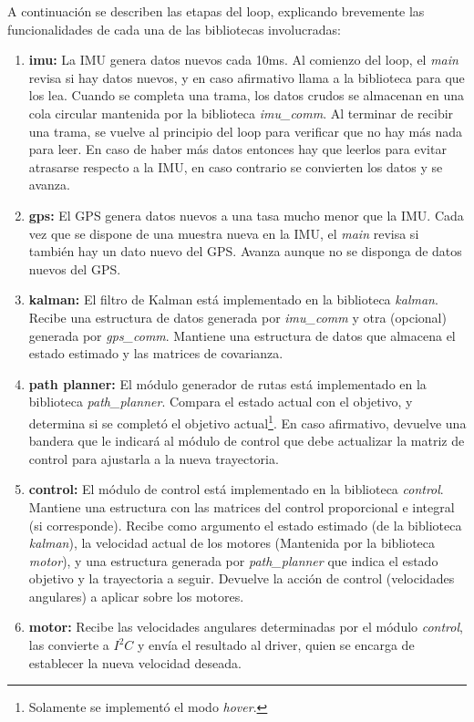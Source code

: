 \documentclass[main]{subfiles}
\begin{document}
A continuaci\'on se describen las etapas del loop, explicando brevemente las funcionalidades de cada una de las bibliotecas involucradas:
\begin{enumerate}

\item \textbf{imu:} La IMU genera datos nuevos cada 10ms. Al comienzo del loop, el \textit{main} revisa si hay datos nuevos, y en caso afirmativo llama a la biblioteca para que los lea. Cuando se completa una trama, los datos crudos se almacenan en una cola circular mantenida por la biblioteca \textit{imu\_comm}. Al terminar de recibir una trama, se vuelve al principio del loop para verificar que no hay m\'as nada para leer. En caso de haber m\'as datos entonces hay que leerlos para evitar atrasarse respecto a la IMU, en caso contrario se convierten los datos y se avanza.

\item \textbf{gps:} El GPS genera datos nuevos a una tasa mucho menor que la IMU. Cada vez que se dispone de una muestra nueva en la IMU, el \textit{main} revisa si tambi\'en hay un dato nuevo del GPS. Avanza aunque no se disponga de datos nuevos del GPS.

\item \textbf{kalman:} El filtro de Kalman est\'a implementado en la biblioteca \textit{kalman}. Recibe una estructura de datos generada por \textit{imu\_comm} y otra (opcional) generada por \textit{gps\_comm}. Mantiene una estructura de datos que almacena el estado estimado y las matrices de covarianza.

\item \textbf{path planner:} El m\'odulo generador de rutas est\'a implementado en la biblioteca \textit{path\_planner}. Compara el estado actual con el objetivo, y determina si se completó el objetivo actual\footnote{Solamente se implement\'o el modo \textit{hover}.}. En caso afirmativo, devuelve una bandera que le indicar\'a al m\'odulo de control que debe actualizar la matriz de control para ajustarla a la nueva trayectoria.

\item \textbf{control:} El m\'odulo de control est\'a implementado en la biblioteca \textit{control}. Mantiene una estructura con las matrices del control proporcional e integral (si corresponde). Recibe como argumento el estado estimado (de la biblioteca \textit{kalman}), la velocidad actual de los motores (Mantenida por la biblioteca \textit{motor}), y una estructura generada por \textit{path\_planner} que indica el estado objetivo y la trayectoria a seguir. Devuelve la acci\'on de control (velocidades angulares) a aplicar sobre los motores.

\item \textbf{motor:} Recibe las velocidades angulares determinadas por el m\'odulo \textit{control}, las convierte a $I^2C$ y env\'ia el resultado al driver, quien se encarga de establecer la nueva velocidad deseada.

\end{enumerate}
\end{document}
